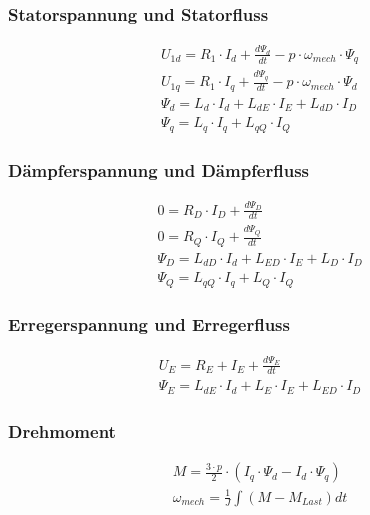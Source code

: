 \subsubsection{Statorspannung und Statorfluss}
{\setlength{\jot}{2pt}
\begin{gather*}
U_{1d} = R_1 \cdot I_d + \frac{d\Psi_d}{dt} - p \cdot \omega_{mech} \cdot \Psi_q \\
U_{1q} = R_1 \cdot I_q + \frac{d\Psi_q}{dt} - p \cdot \omega_{mech} \cdot \Psi_d \\
\Psi_d = L_d \cdot I_d + L_{dE} \cdot I_E + L_{dD} \cdot I_D \\
\Psi_q = L_q \cdot I_q + L_{qQ} \cdot I_Q
\end{gather*}}

\subsubsection{Dämpferspannung und Dämpferfluss}
{\setlength{\jot}{2pt}
\begin{gather*}
0 = R_D \cdot I_D + \frac{d\Psi_D}{dt} \\
0 = R_Q \cdot I_Q + \frac{d\Psi_Q}{dt} \\
\Psi_D = L_{dD} \cdot I_d + L_{ED} \cdot I_E + L_D \cdot I_D \\
\Psi_Q = L_{qQ} \cdot I_q + L_Q \cdot I_Q
\end{gather*}}

\subsubsection{Erregerspannung und Erregerfluss}
{\setlength{\jot}{2pt}
\begin{gather*}
U_E = R_E + I_E + \frac{d\Psi_E}{dt} %
\\
\Psi_E = L_{dE} \cdot I_d + L_E \cdot I_E + L_{ED} \cdot I_D
\end{gather*}}

\columnbreak
\subsubsection{Drehmoment}
\begin{gather*}
M = \frac{3 \cdot p}{2} \cdot (I_q \cdot \Psi_d - I_d \cdot \Psi_q) \\
\omega_{mech} = \frac{1}{J} \int (M - M_{Last}) dt
\end{gather*}

